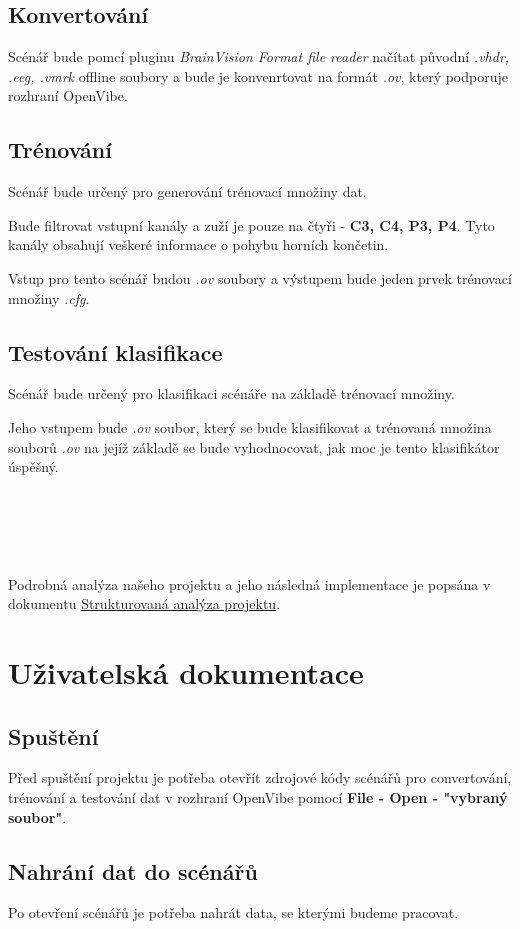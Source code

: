 \documentclass{report}
\begin{document}
\section{Konvertování}
%
Scénář bude pomcí pluginu \textit{BrainVision Format file reader} načítat původní  \textit{.vhdr, .eeg, .vmrk} offline soubory a bude je konvenrtovat na formát \textit{.ov}, který podporuje rozhraní OpenVibe.
%
\section{Trénování}
Scénář bude určený pro generování trénovací množiny dat.

Bude filtrovat vstupní kanály a zuží je pouze na čtyři - \textbf{C3, C4, P3, P4}. Tyto kanály obsahují veškeré informace o pohybu horních končetin.

Vstup pro tento scénář budou \textit{.ov} soubory a výstupem bude jeden prvek trénovací množiny \textit{.cfg}.
%
\section{Testování klasifikace}
Scénář bude určený pro klasifikaci scénáře na základě trénovací množiny.

Jeho vstupem bude \textit{.ov} soubor, který se bude klasifikovat a trénovaná množina souborů \textit{.ov} na jejíž základě se bude vyhodnocovat, jak moc je tento klasifikátor úspěšný.
\\
\\
\\
\\
\\
\\
Podrobná analýza našeho projektu a jeho následná implementace je popsána v dokumentu
\href{https://docs.google.com/document/d/1DZhPO0-b6VwDLwlwbTCjLrkphk3x23aponyvLbC3uOU/edit?usp=sharing}{Strukturovaná analýza projektu}.


\chapter{Uživatelská dokumentace}
\section{Spuštění}
Před spuštění projektu je potřeba otevřít zdrojové kódy scénářů pro convertování, trénování a testování dat v rozhraní OpenVibe pomocí \textbf{File - Open - "vybraný soubor"}.

 
\section{Nahrání dat do scénářů}
Po otevření scénářů je potřeba nahrát data, se kterými budeme pracovat.
\end{document}
